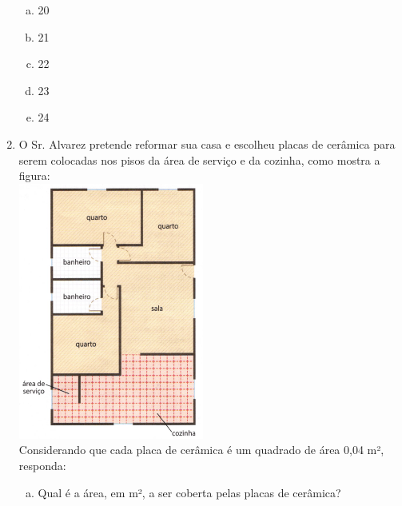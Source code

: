 \documentclass[a4paper,14pt]{article}
\begin{document}
\begin{multicols}{2}
\begin{enumerate}
			\begin{enumerate}[a)]
				\item 20
				\item 21
				\item 22
				\item 23
				\item 24
			\end{enumerate}
			\item O Sr. Alvarez pretende reformar sua casa e escolheu placas de cerâmica para serem colocadas nos pisos da área de serviço e da cozinha, como mostra a figura: \\
			\includegraphics[width=1\linewidth]{6FMA89_imagens/imagem18} \\
			Considerando que cada placa de cerâmica é um quadrado de área 0,04 m², responda: \\
			\begin{enumerate}[a)]
				\item Qual é a área, em m², a ser coberta pelas placas de cerâmica? \\\\\\\\\\\\

\end{enumerate}
\end{enumerate}
\end{multicols}
\end{document}
